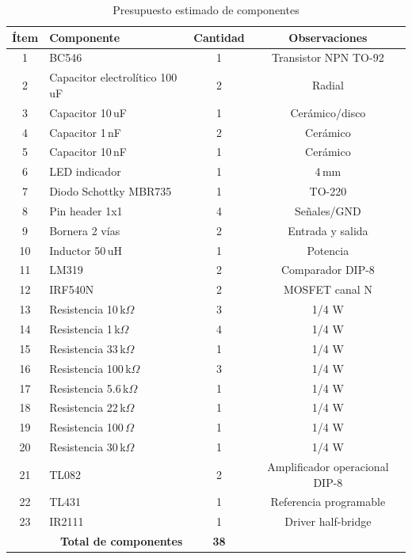 \documentclass[]{article}
\begin{document}
\begin{table}[H]
	\centering
	\caption{Presupuesto estimado de componentes}
	\label{tab:presupuesto_componentes}
	
	\begin{tabular}{|c|l|c|c|}
		\hline
		\textbf{Ítem} & \textbf{Componente} & \textbf{Cantidad} & \textbf{Observaciones} \\
		\hline
		
		1  & BC546                          & 1  & Transistor NPN TO-92 \\
		2  & Capacitor electrolítico 100\,uF & 2  & Radial \\
		3  & Capacitor 10\,uF               & 1  & Cerámico/disco \\
		4  & Capacitor 1\,nF                & 2  & Cerámico \\
		5  & Capacitor 10\,nF               & 1  & Cerámico \\
		6  & LED indicador                  & 1  & 4\,mm \\
		7  & Diodo Schottky MBR735          & 1  & TO-220 \\
		8  & Pin header 1x1                 & 4  & Señales/GND \\
		9  & Bornera 2 vías                 & 2  & Entrada y salida \\
		10 & Inductor 50\,uH                & 1  & Potencia \\
		11 & LM319                          & 2  & Comparador DIP-8 \\
		12 & IRF540N                        & 2  & MOSFET canal N \\
		13 & Resistencia 10\,k$\Omega$      & 3  & 1/4 W \\
		14 & Resistencia 1\,k$\Omega$       & 4  & 1/4 W \\
		15 & Resistencia 33\,k$\Omega$      & 1  & 1/4 W \\
		16 & Resistencia 100\,k$\Omega$     & 3  & 1/4 W \\
		17 & Resistencia 5.6\,k$\Omega$     & 1  & 1/4 W \\
		18 & Resistencia 22\,k$\Omega$      & 1  & 1/4 W \\
		19 & Resistencia 100\,$\Omega$      & 1  & 1/4 W \\
		20 & Resistencia 30\,k$\Omega$      & 1  & 1/4 W \\
		21 & TL082                          & 2  & Amplificador operacional DIP-8 \\
		22 & TL431                          & 1  & Referencia programable \\
		23 & IR2111                         & 1  & Driver half-bridge \\
		\hline
		
		\multicolumn{2}{|r|}{\textbf{Total de componentes}} & \textbf{38} & \\
		\hline
		
	\end{tabular}
\end{table}
	
\end{document}
